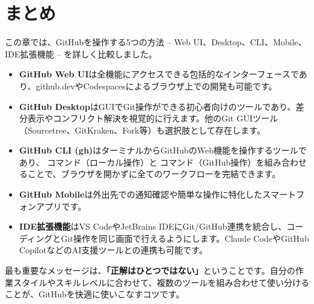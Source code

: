 \section{まとめ}

この章では、GitHubを操作する5つの方法 -- Web UI、Desktop、CLI、Mobile、IDE拡張機能 -- を詳しく比較しました。

\begin{itemize}
  \item \textbf{GitHub Web UI}は全機能にアクセスできる包括的なインターフェースであり、github.devやCodespacesによるブラウザ上での開発も可能です。
  \item \textbf{GitHub Desktop}はGUIでGit操作ができる初心者向けのツールであり、差分表示やコンフリクト解決を視覚的に行えます。他のGit GUIツール（Sourcetree、GitKraken、Fork等）も選択肢として存在します。
  \item \textbf{GitHub CLI (gh)}はターミナルからGitHubのWeb機能を操作するツールであり、 コマンド（ローカル操作）と  コマンド（GitHub操作）を組み合わせることで、ブラウザを開かずに全てのワークフローを完結できます。
  \item \textbf{GitHub Mobile}は外出先での通知確認や簡単な操作に特化したスマートフォンアプリです。
  \item \textbf{IDE拡張機能}はVS CodeやJetBrains IDEにGit/GitHub連携を統合し、コーディングとGit操作を同じ画面で行えるようにします。Claude CodeやGitHub CopilotなどのAI支援ツールとの連携も可能です。
\end{itemize}

最も重要なメッセージは、\textbf{「正解はひとつではない」}ということです。自分の作業スタイルやスキルレベルに合わせて、複数のツールを組み合わせて使い分けることが、GitHubを快適に使いこなすコツです。

